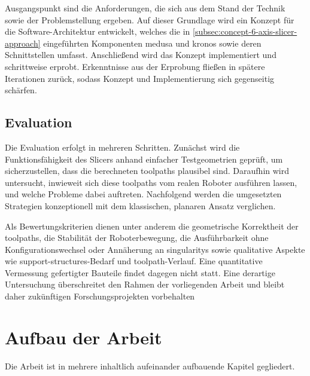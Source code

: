             Ausgangspunkt sind die Anforderungen, die sich aus dem Stand der Technik sowie der Problemstellung ergeben.
            Auf dieser Grundlage wird ein Konzept für die Software-Architektur entwickelt, welches die in \cref{subsec:concept-6-axis-slicer-approach} eingeführten Komponenten \ac{medusa} und \ac{kronos} sowie deren Schnittstellen umfasst.
            Anschließend wird das Konzept implementiert und schrittweise erprobt.
            Erkenntnisse aus der Erprobung fließen in spätere Iterationen zurück, sodass Konzept und Implementierung sich gegenseitig schärfen.

        \subsection{Evaluation}\label{subsec:evaluation-concept-and-comparison-criteria}
            Die Evaluation erfolgt in mehreren Schritten.
            Zunächst wird die Funktionsfähigkeit des Slicers anhand einfacher Testgeometrien geprüft, um sicherzustellen, dass die berechneten \glspl{toolpath} plausibel sind.
            Daraufhin wird untersucht, inwieweit sich diese \glspl{toolpath} vom realen Roboter ausführen lassen, und welche Probleme dabei auftreten.
            Nachfolgend werden die umgesetzten Strategien konzeptionell mit dem klassischen, planaren Ansatz verglichen.

            Als Bewertungskriterien dienen unter anderem die geometrische Korrektheit der \glspl{toolpath}, die Stabilität der Roboterbewegung, die Ausführbarkeit ohne Konfigurationswechsel oder Annäherung an \glspl{singularity} sowie qualitative Aspekte wie \gls{support-structures}-Bedarf und \gls{toolpath}-Verlauf.
            Eine quantitative Vermessung gefertigter Bauteile findet dagegen nicht statt.
            Eine derartige Untersuchung überschreitet den Rahmen der vorliegenden Arbeit und bleibt daher zukünftigen Forschungsprojekten vorbehalten

    \section{Aufbau der Arbeit}\label{sec:thesis-structure}
        Die Arbeit ist in mehrere inhaltlich aufeinander aufbauende Kapitel gegliedert.

